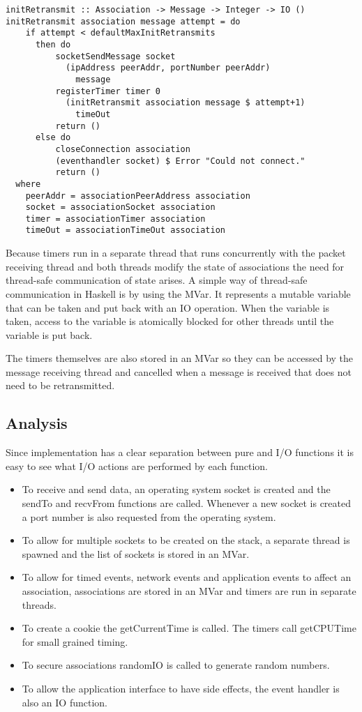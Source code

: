 \begin{lstlisting}[caption={The init retransmission function}, label={lst-retransmission}]
initRetransmit :: Association -> Message -> Integer -> IO ()
initRetransmit association message attempt = do
    if attempt < defaultMaxInitRetransmits
      then do
          socketSendMessage socket 
            (ipAddress peerAddr, portNumber peerAddr)
              message
          registerTimer timer 0
            (initRetransmit association message $ attempt+1)
              timeOut
          return ()
      else do
          closeConnection association
          (eventhandler socket) $ Error "Could not connect."
          return ()
  where
    peerAddr = associationPeerAddress association
    socket = associationSocket association
    timer = associationTimer association
    timeOut = associationTimeOut association
\end{lstlisting}
Because timers run in a separate thread that runs concurrently with the packet receiving thread and both threads modify the state of associations the need for thread-safe communication of state arises. 
A simple way of thread-safe communication in Haskell is by using the MVar.
It represents a mutable variable that can be taken and put back with an IO operation.
When the variable is taken, access to the variable is atomically blocked for other threads until the variable is put back. 

The timers themselves are also stored in an MVar so they can be accessed by the message receiving thread and cancelled when a message is received that does not need to be retransmitted.

\subsection{Analysis}
Since implementation has a clear separation between pure and I/O functions it is easy to see what I/O actions are performed by each function. 

\begin{itemize}
\item To receive and send data, an operating system socket is created and the sendTo and recvFrom functions are called. Whenever a new socket is created a port number is also requested from the operating system.
\item To allow for multiple sockets to be created on the stack, a separate thread is spawned and the list of sockets is stored in an MVar.
\item To allow for timed events, network events and application events to affect an association, associations are stored in an MVar and timers are run in separate threads.
\item To create a cookie the getCurrentTime is called. The timers call getCPUTime for small grained timing.
\item To secure associations randomIO is called to generate random numbers.
\item To allow the application interface to have side effects, the event handler is also an IO function.
\end{itemize}

